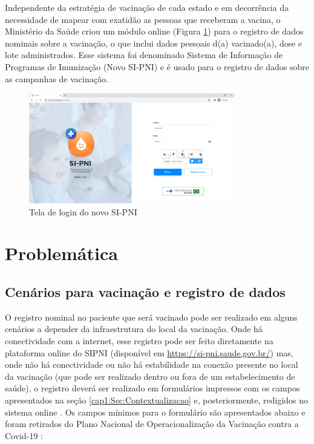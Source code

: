 Independente da estratégia de vacinação de cada estado e em decorrência da necessidade de mapear com exatidão as pessoas que receberam a vacina, o Ministério da Saúde criou um módulo online (Figura \ref{fig:sipni_login}) para o registro de dados nominais sobre a vacinação, o que inclui dados pessoais d(a) vacinado(a), dose e lote administrados. Esse sistema foi denominado Sistema de Informação de Programas de Imunização (Novo SI-PNI) e é usado para o registro de dados sobre as campanhas de vacinação.

\begin{figure}[!ht]
  \centering
  \includegraphics[width=0.8\textwidth]{figuras/cap1/1_1_pagina_login_sipni.png}
  \caption{Tela de login do novo SI-PNI}
  \label{fig:sipni_login}
\end{figure}

\section{Problemática}
\label{cap1:Sec:Problematica}
\subsection{Cenários para vacinação e registro de dados}
\label{cap1:SubSec:CenariosVacinacao}
O registro nominal no paciente que será vacinado pode ser realizado em alguns cenários a depender da infraestrutura do local da vacinação. Onde há conectividade com a internet, esse registro pode ser feito diretamente na plataforma online do SIPNI (disponível em \url{https://si-pni.saude.gov.br/}) mas, onde não há conectividade ou não há estabilidade na conexão presente no local da vacinação (que pode ser realizado dentro ou fora de um estabelecimento de saúde), o registro deverá ser realizado em formulários impressos com os campos apresentados na seção \ref{cap1:Sec:Contextualizacao} e, posteriormente, redigidos no sistema online \cite{ministerio2022plano}. Os campos mínimos para o formulário são apresentados abaixo e foram retirados do Plano Nacional de Operacionalização da Vacinação contra a Covid-19 \cite{ministerio2022plano}:

